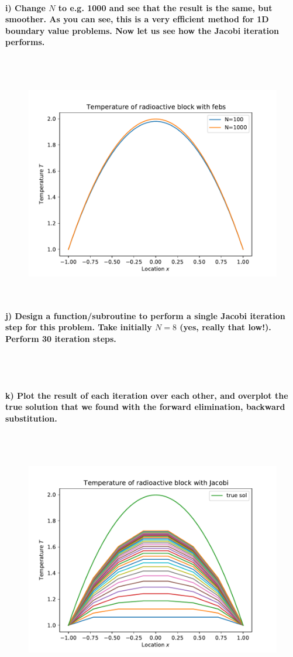 \paragraph{
    i) Change $N$ to e.g. 1000 and see that the result is the same, but
    smoother. As you can see, this is a very efficient method for 1D
    boundary value problems. Now let us see how the Jacobi iteration
    performs.
} \ \\
    \\
    \begin{figure}[h!]
	\centering
	\includegraphics[width=.7\textwidth]{../figures/Aufg1h.pdf}
\end{figure} \ \\

\paragraph{
    j) Design a function/subroutine to perform a single Jacobi iteration
    step for this problem. Take initially $N=8$ (yes, really that low!).
    Perform 30 iteration steps.
} \ \\
    \\

\paragraph{
    k) Plot the result of each iteration over each other, and overplot
    the true solution that we found with the forward elimination,
    backward substitution.
} \ \\
    \\
    \begin{figure}[h!]
        \centering
        \includegraphics[width=.7\textwidth]{../figures/Aufg1k.pdf}
    \end{figure} \ \\

